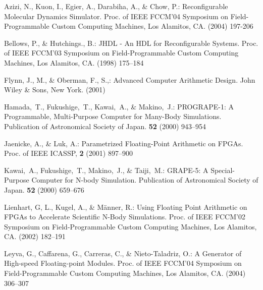 \documentclass{llncs}
\begin{document}

\begin{thebibliography}{}

Azizi, N., Kuon, I., Egier, A., Darabiha, A., \& Chow, P.:
Reconfigurable Molecular Dynamics Simulator.
Proc. of IEEE FCCM'04 Symposium on Field-Programmable Custom Computing Machines, Los Alamitos, CA.
(2004) 197-206

Bellows, P., \& Hutchings., B.:
JHDL - An HDL for Reconfigurable Systems.
Proc. of IEEE FCCM'03 Symposium on Field-Programmable Custom Computing Machines, Los Alamitos, CA.
(1998) 175--184

Flynn, J., M., \& Oberman, F., S.,:
Advanced Computer Arithmetic Design.
John Wiley \& Sons, New York.
(2001)


Hamada,~T., Fukushige,~T., Kawai,~A., \& Makino,~J.:
PROGRAPE-1: A Programmable, Multi-Purpose Computer for Many-Body Simulations.
Publication of Astronomical Society of Japan.
{\bfseries 52} (2000) 943--954


Jaenicke, A., \& Luk, A.:
Parametrized Floating-Point Arithmetic on FPGAs.
Proc. of IEEE ICASSP, 
{\bfseries 2} (2001) 897--900

Kawai,~A., Fukushige,~T., Makino,~J., \& Taiji,~M.:
GRAPE-5: A Special-Purpose Computer for N-body Simulation.
Publication of Astronomical Society of Japan.
{\bfseries 52} (2000) 659--676

Lienhart, G, L., Kugel, A., \& M{\"a}nner, R.:
Using Floating Point Arithmetic on FPGAs to Accelerate Scientific N-Body Simulations.
Proc. of IEEE FCCM'02 Symposium on Field-Programmable Custom Computing Machines, Los Alamitos, CA.
(2002) 182--191

Leyva, G., Caffarena, G., Carreras, C., \& Nieto-Taladriz, O.:
A Generator of High-speed Floating-point Modules.
Proc. of IEEE FCCM'04 Symposium on Field-Programmable Custom Computing Machines, Los Alamitos, CA.
(2004) 306--307 


\end{thebibliography}
\end{document}
